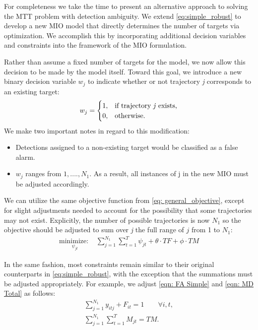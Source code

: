 For completeness we take the time to present an alternative approach to solving the MTT problem with detection ambiguity. We extend \eqref{eq:simple_robust} to develop a new MIO model that directly determines the number of targets via optimization. We accomplish this by incorporating additional decision variables and constraints into the framework of the MIO formulation. 

Rather than assume a fixed number of targets for the model, we now allow this decision to be made by the model itself. Toward this goal, we introduce a new binary decision variable $w_{j}$ to indicate whether or not trajectory \textit{j} corresponds to an existing target:
\[w_{j} = 
\begin{cases}
1, & \text{if trajectory \textit{j} exists,}\\
0, & \text{otherwise.}
\end{cases}\]
We make two important notes in regard to this modification:
\begin{itemize}
\item Detections assigned to a non-existing target would be classified as a false alarm. 
\item $w_{j}$ ranges from $1,....,N_{1}$. As a result, all instances of j in the new MIO must be adjusted accordingly.
\end{itemize}

We can utilize the same objective function from \eqref{eq: general_objective}, except for slight adjustments needed to account for the possibility that some trajectories may not exist. Explicitly, the number of possible trajectories is now $N_{1}$ so the objective should be adjusted to sum over \textit{j} the full range of $j$ from 1 to $N_{1}$:
\begin{align*}
\underset{\psi_{jt}}{\text{minimize: }} & \sum_{j=1}^{N_{1}} \sum_{t=1}^{T} \psi_{jt} + \theta \cdot TF + \phi \cdot TM
\end{align*}

In the same fashion, most constraints remain similar to their original counterparts in \eqref{eq:simple_robust}, with the exception that the summations must be adjusted appropriately. For example, we adjust \eqref{eqn: FA Simple} and \eqref{eqn: MD Total} as follows: 
\begin{align*}
\sum_{j=1}^{N_{1}} y_{itj} + F_{it} = 1 \qquad \forall i,t,\\
\sum_{j=1}^{N_{1}} \sum_{t=1}^{T} M_{jt} = TM.
\end{align*}

